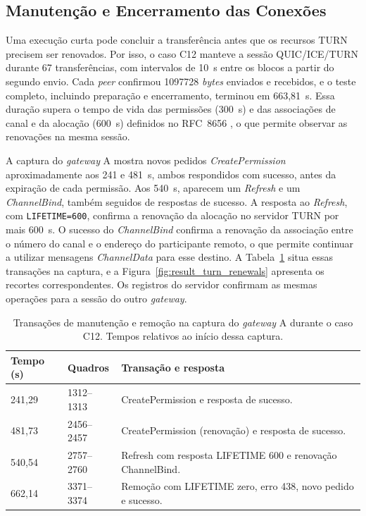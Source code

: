 \subsection{Manutenção e Encerramento das Conexões}
\label{sec:functional_maintenance_shutdown}

Uma execução curta pode concluir a transferência antes que os recursos TURN precisem ser renovados. Por isso, o caso C12 manteve a sessão QUIC/ICE/TURN durante 67 transferências, com intervalos de 10~s entre os blocos a partir do segundo envio. Cada \textit{peer} confirmou 1097728 \textit{bytes} enviados e recebidos, e o teste completo, incluindo preparação e encerramento, terminou em 663,81~s. Essa duração supera o tempo de vida das permissões (300~s) e das associações de canal e da alocação (600~s) definidos no RFC~8656 \citep{rfc8656}, o que permite observar as renovações na mesma sessão.

A captura do \textit{gateway} A mostra novos pedidos \textit{CreatePermission} aproximadamente aos 241 e 481~s, ambos respondidos com sucesso, antes da expiração de cada permissão. Aos 540~s, aparecem um \textit{Refresh} e um \textit{ChannelBind}, também seguidos de respostas de sucesso. A resposta ao \textit{Refresh}, com \texttt{LIFETIME=600}, confirma a renovação da alocação no servidor TURN por mais 600~s. O sucesso do \textit{ChannelBind} confirma a renovação da associação entre o número do canal e o endereço do participante remoto, o que permite continuar a utilizar mensagens \textit{ChannelData} para esse destino. A Tabela~\ref{tab:functional_lifecycle} situa essas transações na captura, e a Figura~\ref{fig:result_turn_renewals} apresenta os recortes correspondentes. Os registros do servidor confirmam as mesmas operações para a sessão do outro \textit{gateway}.

\begin{table}[htbp]
    \centering
    \caption{Transações de manutenção e remoção na captura do \textit{gateway} A
    durante o caso C12. Tempos relativos ao início dessa captura.}
    \label{tab:functional_lifecycle}
    \small
    \begin{tabular}{@{}p{}p{}p{}@{}}
        \toprule
        \textbf{Tempo (s)} & \textbf{Quadros} & \textbf{Transação e resposta} \\
        \midrule
        241,29 & 1312--1313 & CreatePermission e resposta de sucesso. \\
        481,73 & 2456--2457 & CreatePermission (renovação) e resposta de sucesso. \\
        540,54 & 2757--2760 & Refresh com resposta LIFETIME 600 e renovação ChannelBind. \\
        662,14 & 3371--3374 & Remoção com LIFETIME zero, erro 438, novo pedido e sucesso. \\
        \bottomrule
    \end{tabular}
\end{table}

